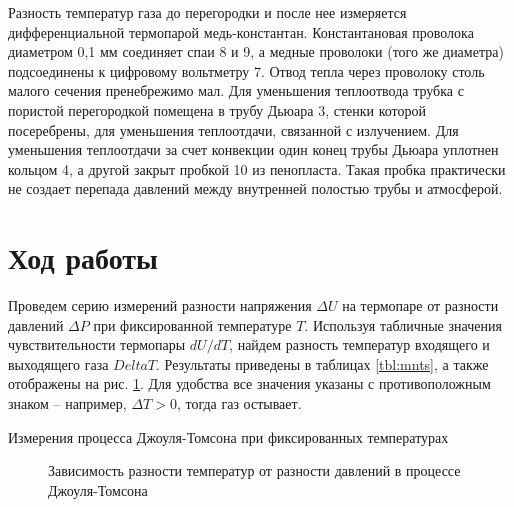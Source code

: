 \documentclass[a4paper,12pt]{article}
\begin{document}
  Разность температур газа до перегородки и после нее измеряется дифференциальной термопарой медь-константан. Константановая проволока диаметром 0,1 мм соединяет спаи 8 и 9, а медные проволоки (того же диаметра) подсоединены к цифровому вольтметру 7. Отвод тепла через проволоку столь малого сечения пренебрежимо мал. Для уменьшения теплоотвода трубка с пористой перегородкой помещена в трубу Дьюара 3, стенки которой посеребрены, для уменьшения теплоотдачи, связанной с излучением. Для уменьшения теплоотдачи за счет конвекции один конец трубы Дьюара уплотнен кольцом 4, а другой закрыт пробкой 10 из пенопласта. Такая пробка практически не создает перепада давлений между внутренней полостью трубы и атмосферой.

\section{Ход работы}
  Проведем серию измерений разности напряжения $\Delta U$ на термопаре от разности давлений $\Delta P$ при фиксированной температуре $T$. Используя табличные значения чувствительности термопары $dU/dT$, найдем разность температур входящего и выходящего газа $Delta T$. Результаты приведены в таблицах \ref{tbl:mnts}, а также отображены на рис. \ref{fig:press_temp}. Для удобства все значения указаны с противоположным знаком -- например, $\Delta T > 0$, тогда газ остывает.

  \begin{table}[!htb]
    \begin{minipage}{0.5\textwidth}
      \centering
      

      \vspace*{5mm}
      
    \end{minipage}
    \hspace{5mm}
    \begin{minipage}{0.5\textwidth}
      \centering
      

      \vspace*{5mm}
      
    \end{minipage}
    \caption{Измерения процесса Джоуля-Томсона при фиксированных температурах}
    \label{tbl:mnts}
  \end{table}

  \begin{figure}[!htb]
    \centering
    
    \caption{Зависимость разности температур от разности давлений в процессе Джоуля-Томсона}
    \label{fig:press_temp}
  \end{figure}
\end{document}
